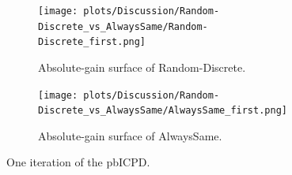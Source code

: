 \documentclass[11pt]{article}
\begin{document}
	\begin{figure}[h]
		\centering
		\begin{subfigure}[t]{0.45\textwidth}
			\centering
			\texttt{[image: plots/Discussion/Random-Discrete\_vs\_AlwaysSame/Random-Discrete\_first.png]}
			\caption{Absolute-gain surface of Random-Discrete.}
			\label{fig:RNDD_one-iter}
		\end{subfigure}\hfill
		\begin{subfigure}[t]{0.45\textwidth}
			\centering
			\texttt{[image: plots/Discussion/Random-Discrete\_vs\_AlwaysSame/AlwaysSame\_first.png]}\\
			\caption{Absolute-gain surface of AlwaysSame.}
			\label{fig:ALWS_one-iter}
		\end{subfigure}
		\caption{One iteration of the pbICPD.}
		\label{fig:two_one-iter}
	\end{figure}
\end{document}
